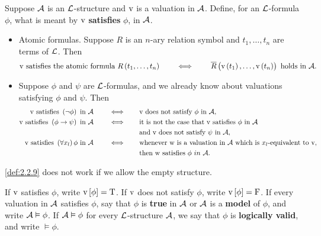 \begin{definition}
\label{def:2.2.9}
Suppose $ \mathcal{A} $ is an $ \mathcal{L} $-structure and $ \mathrm{v} $ is a valuation in $ \mathcal{A} $. Define, for an $ \mathcal{L} $-formula $ \phi $, what is meant by $ \mathrm{v} $ \textbf{satisfies} $ \phi $, in $ \mathcal{A} $.
\begin{itemize}
\item Atomic formulas. Suppose $ R $ is an $ n $-ary relation symbol and $ t_1, \dots, t_n $ are terms of $ \mathcal{L} $. Then
$$ \v \ \text{satisfies the atomic formula} \ R\br{t_1, \dots, t_n} \qquad \iff \qquad \overline{R}\br{\v\br{t_1}, \dots, \v\br{t_n}} \ \text{holds in} \ \AAA. $$
\item Suppose $ \phi $ and $ \psi $ are $ \mathcal{L} $-formulas, and we already know about valuations satisfying $ \phi $ and $ \psi $. Then
\begin{align*}
\v \ \text{satisfies} \ \notb{\phi} \ \text{in} \ \AAA \qquad \iff \qquad & \v \ \text{does not satisfy} \ \phi \ \text{in} \ \AAA, \\
\v \ \text{satisfies} \ \impb{\phi}{\psi} \ \text{in} \ \AAA \qquad \iff \qquad & \text{it is not the case that} \ \v \ \text{satisfies} \ \phi \ \text{in} \ \AAA \\
& \text{and} \ \v \ \text{does not satisfy} \ \psi \ \text{in} \ \AAA, \\
\v \ \text{satisfies} \ \fab{x_l}\phi \ \text{in} \ \AAA \qquad \iff \qquad & \text{whenever} \ \w \ \text{is a valuation in} \ \AAA \ \text{which is} \ x_l \text{-equivalent to} \ \v, \\
& \text{then} \ \w \ \text{satisfies} \ \phi \ in \ \AAA.
\end{align*}
\end{itemize}
\end{definition}


\begin{remark*}
\ref{def:2.2.9} does not work if we allow the empty structure.
\end{remark*}

\begin{notation*}
If $ \mathrm{v} $ satisfies $ \phi $, write $ \v\sbr{\phi} = \T $. If $ \mathrm{v} $ does not satisfy $ \phi $, write $ \v\sbr{\phi} = \F $. If every valuation in $ \mathcal{A} $ satisfies $ \phi $, say that $ \phi $ is \textbf{true} in $ \mathcal{A} $ or $ \mathcal{A} $ is a \textbf{model} of $ \phi $, and write $ \mathcal{A} \vDash \phi $. If $ \mathcal{A} \vDash \phi $ for every $ \mathcal{L} $-structure $ \mathcal{A} $, we say that $ \phi $ is \textbf{logically valid}, and write $ \vDash \phi $.
\end{notation*}

